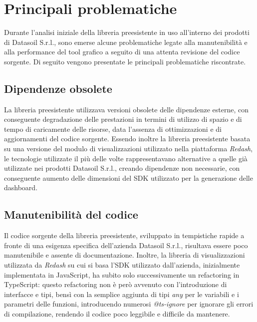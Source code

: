 \section{Principali problematiche}
Durante l'analisi iniziale della libreria preesistente in uso all'interno dei prodotti di Datasoil S.r.l., sono emerse alcune problematiche
legate alla manutenibilità e alla performance del tool grafico a seguito di una attenta revisione del codice sorgente. \newline
Di seguito vengono presentate le principali problematiche riscontrate.

\subsection{Dipendenze obsolete}
La libreria preesistente utilizzava versioni obsolete delle dipendenze esterne, con conseguente degradazione delle prestazioni in termini
di utilizzo di spazio e di tempo di caricamente delle risorse, data l'assenza di ottimizzazioni e di aggiornamenti del codice sorgente. \newline
Essendo inoltre la libreria preesistente basata su una versione del modulo di visualizzazioni utilizzato nella piattaforma \textit{Redash},
le tecnologie utilizzate il più delle volte rappresentavano alternative a quelle già utilizzate nei prodotti Datasoil S.r.l., creando dipendenze
non necessarie, con conseguente aumento delle dimensioni del SDK utilizzato per la generazione delle dashboard.

\subsection{Manutenibilità del codice}
Il codice sorgente della libreria preesistente, sviluppato in tempistiche rapide a fronte di una esigenza specifica dell'azienda Datasoil S.r.l.,
risultava essere poco manutenibile e assente di documentazione. \newline
Inoltre, la libreria di visualizzazioni utilizzata da \textit{Redash} su cui si basa l'SDK utilizzato dall'azienda, inizialmente implementata in JavaScript,
ha subito solo successivamente un refactoring in TypeScript: questo refactoring non è però avvenuto con l'introduzione di interfacce e tipi, bensì con la semplice aggiunta
di tipi \textit{any} per le variabili e i parametri delle funzioni, introducendo numerosi \textit{@ts-ignore} per ignorare gli errori di compilazione, rendendo il codice
poco leggibile e difficile da mantenere.

